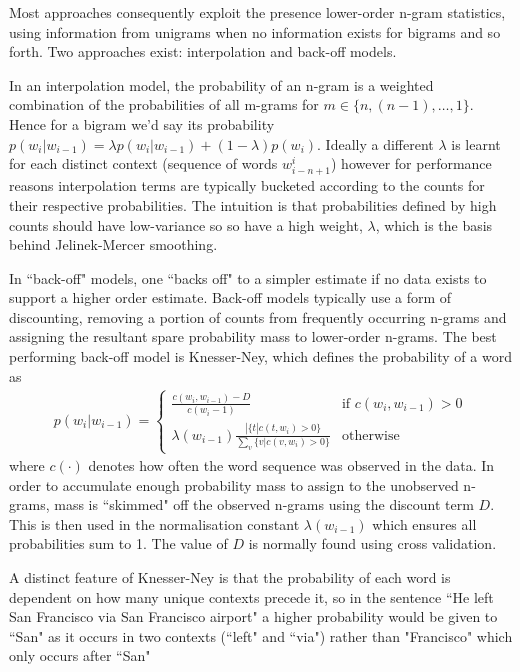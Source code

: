 Most approaches consequently exploit the presence lower-order n-gram statistics, using information from unigrams when no information exists for bigrams and so forth. Two approaches exist: interpolation and back-off models.

In an interpolation model, the probability of an n-gram is a weighted combination of the probabilities of all m-grams for $m \in \{n, (n-1), \ldots, 1\}$. Hence for a bigram we'd say its probability $p(w_i|w_{i-1}) = \lambda p(w_i|w_{i-1}) + (1 - \lambda) p(w_i)$. Ideally a different $\lambda$ is learnt for each distinct context (sequence of words $w^i_{i-n+1}$) however for performance reasons interpolation terms are typically bucketed according to the counts for their respective probabilities. The intuition is that probabilities defined by high counts should have low-variance so so have a high weight, $\lambda$, which is the basis behind Jelinek-Mercer smoothing.

In ``back-off" models, one ``backs off" to a simpler estimate if no data exists to support a higher order estimate. Back-off models typically use a form of discounting, removing a portion of counts from frequently occurring n-grams and assigning the resultant spare probability mass to lower-order n-grams. The best performing back-off model is Knesser-Ney, which defines the probability of a word as 
\begin{align}
p(w_i | w_{i-1}) = \left\{ \begin{array}{lr}
     \frac{c(w_i, w_{i-1}) - D}{c(w_i-1)} & \text{if } c(w_i, w_{i-1}) > 0 \\
     \lambda(w_{i-1})\frac{ | \{t | c(t, w_i) > 0\} }{\sum_v \{v | c(v, w_i) > 0\}} & \text{otherwise}
 \end{array}
\right.
\end{align}
where $c(\cdot)$ denotes how often the word sequence was observed in the data. In order to accumulate enough probability mass to assign to the unobserved n-grams, mass is ``skimmed" off the observed n-grams using the discount term $D$. This is then used in the normalisation constant $\lambda(w_{i-1})$ which ensures all probabilities sum to 1. The value of $D$ is normally found using cross validation.

A distinct feature of Knesser-Ney is that the probability of each word is dependent on how many unique contexts precede it, so in the sentence ``He left San Francisco via San Francisco airport" a higher probability would be given to ``San" as it occurs in two contexts (``left" and ``via") rather than "Francisco" which only occurs after ``San"

